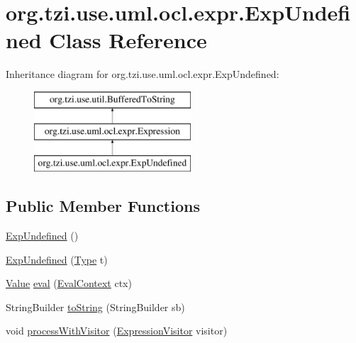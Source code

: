 \hypertarget{classorg_1_1tzi_1_1use_1_1uml_1_1ocl_1_1expr_1_1_exp_undefined}{\section{org.\-tzi.\-use.\-uml.\-ocl.\-expr.\-Exp\-Undefined Class Reference}
\label{classorg_1_1tzi_1_1use_1_1uml_1_1ocl_1_1expr_1_1_exp_undefined}
}
Inheritance diagram for org.\-tzi.\-use.\-uml.\-ocl.\-expr.\-Exp\-Undefined\-:\begin{figure}[H]
\begin{center}
\leavevmode
\includegraphics[height=3.000000cm]{classorg_1_1tzi_1_1use_1_1uml_1_1ocl_1_1expr_1_1_exp_undefined}
\end{center}
\end{figure}
\subsection*{Public Member Functions}
\begin{DoxyCompactItemize}
\item 
\hyperlink{classorg_1_1tzi_1_1use_1_1uml_1_1ocl_1_1expr_1_1_exp_undefined_ad47a16d2e76e24e250e5da3158aa1326}{Exp\-Undefined} ()
\item 
\hyperlink{classorg_1_1tzi_1_1use_1_1uml_1_1ocl_1_1expr_1_1_exp_undefined_a3a7430a4134f89703dee1a2a8b649c44}{Exp\-Undefined} (\hyperlink{interfaceorg_1_1tzi_1_1use_1_1uml_1_1ocl_1_1type_1_1_type}{Type} t)
\item 
\hyperlink{classorg_1_1tzi_1_1use_1_1uml_1_1ocl_1_1value_1_1_value}{Value} \hyperlink{classorg_1_1tzi_1_1use_1_1uml_1_1ocl_1_1expr_1_1_exp_undefined_ad608ac4b548d62eb7a49bb39644c53e8}{eval} (\hyperlink{classorg_1_1tzi_1_1use_1_1uml_1_1ocl_1_1expr_1_1_eval_context}{Eval\-Context} ctx)
\item 
String\-Builder \hyperlink{classorg_1_1tzi_1_1use_1_1uml_1_1ocl_1_1expr_1_1_exp_undefined_a585f6f47d5e4c75ac721bc616911f0dd}{to\-String} (String\-Builder sb)
\item 
void \hyperlink{classorg_1_1tzi_1_1use_1_1uml_1_1ocl_1_1expr_1_1_exp_undefined_a7cce3e4a5c8b77f09627c9d087123329}{process\-With\-Visitor} (\hyperlink{interfaceorg_1_1tzi_1_1use_1_1uml_1_1ocl_1_1expr_1_1_expression_visitor}{Expression\-Visitor} visitor)
\end{DoxyCompactItemize}
